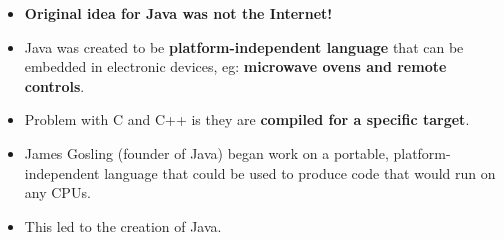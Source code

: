 
\begin{flushleft}
	
	\begin{itemize}
		\item \textbf{Original idea for Java was not the Internet!}
		\item Java was created to be \textbf{platform-independent language} that can be embedded in electronic devices, eg: \textbf{microwave ovens and remote controls}. 
		\item Problem with C and C++  is they are \textbf{compiled for a specific target}. 
		\item James Gosling (founder of Java) began work on a portable, platform-independent language that could be used to produce code that would run on any CPUs.
		\item This led to the creation of Java.
	\end{itemize}

\end{flushleft}


